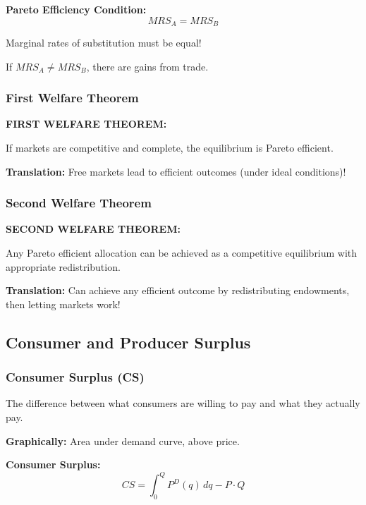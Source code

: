 \documentclass[10pt,letterpaper]{article}
\begin{document}
\begin{formulabox}
\textbf{Pareto Efficiency Condition:}
\[
\boxed{MRS_A = MRS_B}
\]

Marginal rates of substitution must be equal!

If $MRS_A \neq MRS_B$, there are gains from trade.
\end{formulabox}

\subsubsection{First Welfare Theorem}

\begin{tcolorbox}[colback=green!5,colframe=green!70]
\textbf{FIRST WELFARE THEOREM:}

If markets are competitive and complete, the equilibrium is Pareto efficient.

\textbf{Translation:} Free markets lead to efficient outcomes (under ideal conditions)!
\end{tcolorbox}

\subsubsection{Second Welfare Theorem}

\begin{tcolorbox}[colback=green!5,colframe=green!70]
\textbf{SECOND WELFARE THEOREM:}

Any Pareto efficient allocation can be achieved as a competitive equilibrium with appropriate redistribution.

\textbf{Translation:} Can achieve any efficient outcome by redistributing endowments, then letting markets work!
\end{tcolorbox}

\subsection{Consumer and Producer Surplus}

\subsubsection{Consumer Surplus (CS)}

The difference between what consumers are willing to pay and what they actually pay.

\textbf{Graphically:} Area under demand curve, above price.

\begin{formulabox}
\textbf{Consumer Surplus:}
\[
\boxed{CS = \int_0^Q P^D(q) \, dq - P \cdot Q}
\]
\end{formulabox}
\end{document}
